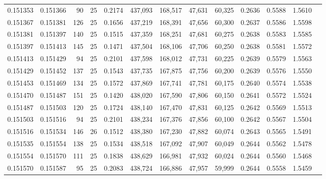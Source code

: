 \begin{tabular}{rrrrrrrrrrrrr}
0.151353 & 0.151366 &    90 &  25 &                                     0.2174 & 437,093 & 168,517 &  47,631 &  60,325 & 0.2636 & 0.5588 & 1.5610 \\
0.151367 & 0.151381 &   126 &  25 &                                     0.1656 & 437,219 & 168,391 &  47,656 &  60,300 & 0.2637 & 0.5586 & 1.5598 \\
0.151381 & 0.151397 &   140 &  25 &                                     0.1515 & 437,359 & 168,251 &  47,681 &  60,275 & 0.2638 & 0.5583 & 1.5585 \\
0.151397 & 0.151413 &   145 &  25 &                                     0.1471 & 437,504 & 168,106 &  47,706 &  60,250 & 0.2638 & 0.5581 & 1.5572 \\
0.151413 & 0.151429 &    94 &  25 &                                     0.2101 & 437,598 & 168,012 &  47,731 &  60,225 & 0.2639 & 0.5579 & 1.5563 \\
0.151429 & 0.151452 &   137 &  25 &                                     0.1543 & 437,735 & 167,875 &  47,756 &  60,200 & 0.2639 & 0.5576 & 1.5550 \\
0.151453 & 0.151469 &   134 &  25 &                                     0.1572 & 437,869 & 167,741 &  47,781 &  60,175 & 0.2640 & 0.5574 & 1.5538 \\
0.151470 & 0.151487 &   151 &  25 &                                     0.1420 & 438,020 & 167,590 &  47,806 &  60,150 & 0.2641 & 0.5572 & 1.5524 \\
0.151487 & 0.151503 &   120 &  25 &                                     0.1724 & 438,140 & 167,470 &  47,831 &  60,125 & 0.2642 & 0.5569 & 1.5513 \\
0.151503 & 0.151516 &    94 &  25 &                                     0.2101 & 438,234 & 167,376 &  47,856 &  60,100 & 0.2642 & 0.5567 & 1.5504 \\
0.151516 & 0.151534 &   146 &  26 &                                     0.1512 & 438,380 & 167,230 &  47,882 &  60,074 & 0.2643 & 0.5565 & 1.5491 \\
0.151535 & 0.151554 &   138 &  25 &                                     0.1534 & 438,518 & 167,092 &  47,907 &  60,049 & 0.2644 & 0.5562 & 1.5478 \\
0.151554 & 0.151570 &   111 &  25 &                                     0.1838 & 438,629 & 166,981 &  47,932 &  60,024 & 0.2644 & 0.5560 & 1.5468 \\
0.151570 & 0.151587 &    95 &  25 &                                     0.2083 & 438,724 & 166,886 &  47,957 &  59,999 & 0.2644 & 0.5558 & 1.5459 \\

\end{tabular}
